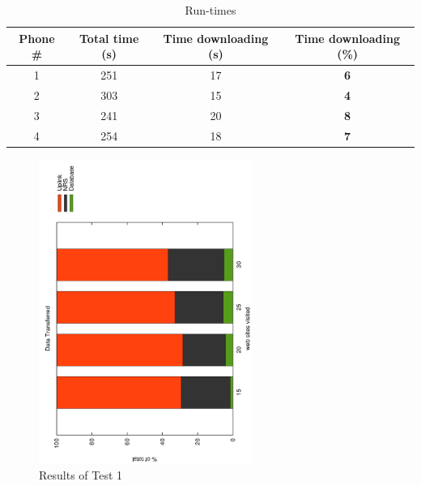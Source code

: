 \begin{table}[H]
		\centering
       \begin{tabular}{| c | c | c | c |}
               \hline
               Phone \# & Total time (s) & Time downloading (s) & Time downloading (\%)\\
               \hline
               1 & 251 & 17 & \textbf{6}\\
               \hline
               2 & 303 & 15 & \textbf{4}\\
               \hline
               3 & 241 & 20 & \textbf{8}\\
               \hline
               4 & 254 & 18 & \textbf{7}\\
               \hline
       \end{tabular}
       \caption{Run-times}
       \label{tbl:times}
\end{table}

\begin{figure}[H]
	\centering
		\includegraphics[width=0.62\textwidth, angle=-90]{./img/plots.pdf}
    	\caption{Results of Test 1}
	\label{fig:frontendtest1}
\end{figure}

